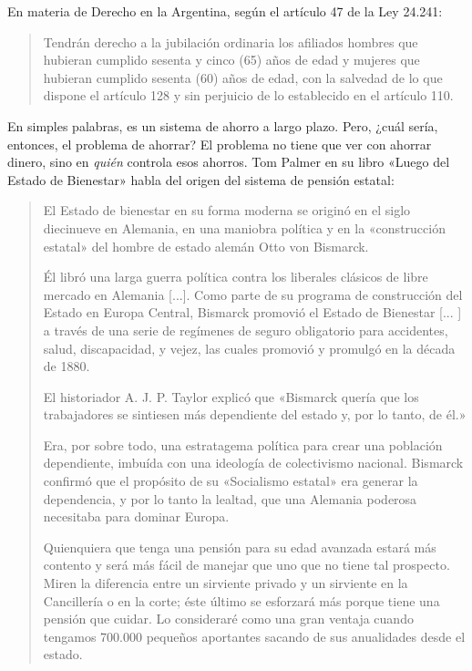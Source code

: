 \documentclass[12pt,a4paper,twoside]{book}
\begin{document}
En materia de Derecho en la Argentina, según el artículo 47 de la Ley 24.241:

\begin{quotation}
Tendrán derecho a la jubilación ordinaria los afiliados hombres que hubieran cumplido sesenta y cinco (65) años de edad y mujeres que hubieran cumplido sesenta (60) años de edad, con la salvedad de lo que dispone el artículo 128 y sin perjuicio de lo establecido en el artículo 110. \cite{ley:24241}
\end{quotation}

En simples palabras, es un sistema de ahorro a largo plazo. Pero, ¿cuál sería, entonces, el problema de ahorrar? El problema no tiene que ver con ahorrar dinero, sino en \textit{quién} controla esos ahorros. Tom Palmer en su libro «Luego del Estado de Bienestar» habla del origen del sistema de pensión estatal:

\begin{quotation}
El Estado de bienestar en su forma moderna se originó en el siglo diecinueve en Alemania, en una maniobra política y en la «construcción estatal» del hombre de estado alemán Otto von Bismarck.

Él libró una larga guerra política contra los liberales clásicos de libre mercado en Alemania [...]. Como parte de su programa de construcción del Estado en Europa Central, Bismarck promovió el Estado de Bienestar [... ] a través de una serie de regímenes de seguro obligatorio para accidentes, salud, discapacidad, y vejez, las cuales promovió y promulgó en la década de 1880.

El historiador A. J. P. Taylor explicó que «Bismarck quería que los trabajadores se sintiesen más dependiente del estado y, por lo tanto, de él.»

Era, por sobre todo, una estratagema política para crear una población dependiente, imbuída con una ideología de colectivismo nacional. Bismarck confirmó que el propósito de su «Socialismo estatal» era generar la dependencia, y por lo tanto la lealtad, que una Alemania poderosa necesitaba para dominar Europa.

Quienquiera que tenga una pensión para su edad avanzada estará más contento y será más fácil de manejar que uno que no tiene tal prospecto. Miren la diferencia entre un sirviente privado y un sirviente en la Cancillería o en la corte; éste último se esforzará más porque tiene una pensión que cuidar. Lo consideraré como una gran ventaja cuando tengamos 700.000 pequeños aportantes sacando de sus anualidades desde el estado. \cite[págs. 34-35]{palmer:jubilacion}
\end{quotation}
\end{document}
